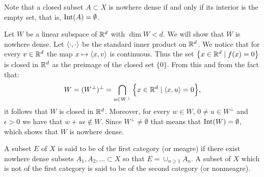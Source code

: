 \documentclass[11pt,a4paper]{article}
\begin{document}
\begin{remark}
  Note that a closed subset $A \subset X$ is nowhere dense if and only if 
  its interior is the empty set, that is, $\operatorname{Int}(A) = \emptyset$.
\end{remark}

\begin{example}
  Let $W$ be a linear subspace of $\mathbb{R}^d$ with $\dim W < d$. We will show
  that $W$ is nowhere dense. Let $\left\langle \cdot, \cdot \right\rangle$ be the standard
  inner product on $\mathbb{R}^d$. We notice that for every $v \in \mathbb{R}^d$ the
  map $x \mapsto \left\langle x, v \right\rangle$ is continuous. Thus the set 
  $\left\{x \in \mathbb{R}^d \mid f(x) = 0\right\}$ is closed in $\mathbb{R}^d$ as the preimage of the
  closed set $\{0\}$. From this and from the fact that:
  \[
    W = (W^{\perp})^{\perp} = 
    \bigcap_{u \in W^{\perp}}{\left\{x \in \mathbb{R}^d \mid \left\langle x, u \right\rangle = 0\right\}},
  \]
  it follows that $W$ is closed in $\mathbb{R}^d$. Moreover, for every $w \in W$,
  $0 \neq u \in W^{\perp}$ and $\epsilon > 0$ we have that 
  $w+u\epsilon \notin W$. Since $W^{\perp} \neq \emptyset$ that means that
  $\operatorname{Int}(W) = \emptyset$, which shows that $W$ is nowhere dense.
\end{example}

\begin{definition}
  A subset $E$ of $X$ is said to be of the first category (or meagre)
  if there exist nowhere dense subsets $A_1,A_2,\dots \subset X$ so that 
  $E = \cup_{n \geq 1}{A_n}$. A subset of $X$ which is not of the first 
  category is said to be of the second category (or nonmeagre).
\end{definition}
\end{document}
